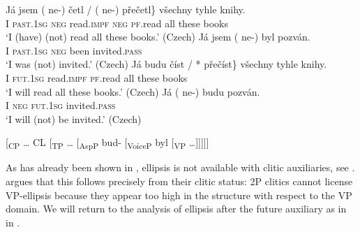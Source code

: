 \documentclass[output=paper,colorlinks,citecolor=brown,
modfonts
]{langscibook}
\begin{document}
\begin{exe}
\ex	\label{11}
\begin{xlist}
\ex\label{11a} \gll Já jsem \minsp{\{} (\hspace{-2pt} ne-) četl / (\hspace{-2pt} ne-) přečetl\} všechny tyhle knihy.\\
I  \textsc{past}.\textsc{1sg} {} {} \textsc{neg} read.\textsc{impf}  {} {} \textsc{neg} \textsc{pf}.read all these books\\
\glt  `I (have) (not) read all these books.' \hfill (Czech)
\ex\label{11b} \gll Já jsem  (\hspace{-2pt} ne-) byl pozván.\\
I  \textsc{past}.\textsc{1sg} {} \textsc{neg} been invited.\textsc{pass} \\
\glt `I was (not) invited.' \hfill (Czech)
\ex\label{11c}\gll Já budu \minsp{\{} číst / *\hspace{-2pt} přečíst\} všechny tyhle knihy.\\
I \textsc{fut}.\textsc{1sg} {} read.\textsc{impf} {} {} \textsc{pf}.read all these books\\
\glt   `I will read all these books.'  \hfill (Czech)
\ex\label{11d}\gll Já (\hspace{-2pt} ne-) budu  pozván.\\
I  {} \textsc{neg} \textsc{fut}.\textsc{1sg} invited.\textsc{pass}\\
\glt `I will (not) be invited.'  \hfill (Czech)
\end{xlist}

\ex \label{12} {[\textsubscript{CP} {\ldots} CL [\textsubscript{TP} {\ldots} [\textsubscript{AspP} bud- [\textsubscript{VoiceP}  byl [\textsubscript{VP} {\ldots}]]]]]}
\end{exe}

\noindent As has already been shown in , ellipsis is not available with clitic auxiliaries, see . \cite{Gruet-Skrabalova2012} argues that this follows precisely from their clitic status: 2P clitics cannot license VP-ellipsis because they appear too high in the structure with respect to the VP domain. We will return to the analysis of ellipsis after the future auxiliary as in  in .

\ea\label{13}
\z\z
\end{document}
